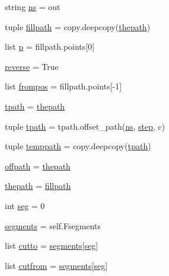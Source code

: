 \begin{DoxyCompactItemize}
\item 
string \hyperlink{classpath_1_1_path_aba8a261c06a62c46b5b50cc2218984e5}{ns} = \textquotesingle{}out\textquotesingle{}
\item 
tuple \hyperlink{classpath_1_1_path_ae925ef71c080bd87e3599b6d4f9944fc}{fillpath} = copy.\+deepcopy(\hyperlink{classpath_1_1_path_a4337dff6fcad60083e92642dd6e15dea}{thepath})
\item 
list \hyperlink{classpath_1_1_path_a4ca57bb02bfd7328aa373670e42cc7c2}{p} = fillpath.\+points\mbox{[}0\mbox{]}
\item 
\hyperlink{classpath_1_1_path_a3cd9f7f776de6ac323126a84e0a9d118}{reverse} = True
\item 
list \hyperlink{classpath_1_1_path_a17defa4d0edda7c8df002844662f3eb5}{frompos} = fillpath.\+points\mbox{[}-\/1\mbox{]}
\item 
\hyperlink{classpath_1_1_path_a082ac83dbda37eba9befcae8be0df595}{tpath} = \hyperlink{classpath_1_1_path_a4337dff6fcad60083e92642dd6e15dea}{thepath}
\item 
tuple \hyperlink{classpath_1_1_path_a267b3e61d69b7d9283b8d751eda8eaab}{tpath} = tpath.\+offset\+\_\+path(\hyperlink{classpath_1_1_path_acee5971500259152902b431cfae4248a}{ns}, \hyperlink{classpath_1_1_path_a197eeae0afc70cd672c698e5aa7fda86}{step}, c)
\item 
tuple \hyperlink{classpath_1_1_path_ac029f86e7895332b5d9a4a2948e18f4f}{temppath} = copy.\+deepcopy(\hyperlink{classpath_1_1_path_a082ac83dbda37eba9befcae8be0df595}{tpath})
\item 
\hyperlink{classpath_1_1_path_a9c87a4a17044e1bdfc596ebc4f894b60}{offpath} = \hyperlink{classpath_1_1_path_a4337dff6fcad60083e92642dd6e15dea}{thepath}
\item 
\hyperlink{classpath_1_1_path_a4337dff6fcad60083e92642dd6e15dea}{thepath} = \hyperlink{classpath_1_1_path_ae925ef71c080bd87e3599b6d4f9944fc}{fillpath}
\item 
int \hyperlink{classpath_1_1_path_a32a005518b591b36c440e28d127b3058}{seg} = 0
\item 
\hyperlink{classpath_1_1_path_a9f41c796727af301dfd7803f47f4414c}{segments} = self.\+Fsegments
\item 
list \hyperlink{classpath_1_1_path_a5c2420e508fe938cb377392ba67e40c6}{cutto} = \hyperlink{classpath_1_1_path_a9f41c796727af301dfd7803f47f4414c}{segments}\mbox{[}\hyperlink{classpath_1_1_path_a32a005518b591b36c440e28d127b3058}{seg}\mbox{]}
\item 
list \hyperlink{classpath_1_1_path_af61683e602531ffee156f32343753260}{cutfrom} = \hyperlink{classpath_1_1_path_a9f41c796727af301dfd7803f47f4414c}{segments}\mbox{[}\hyperlink{classpath_1_1_path_a32a005518b591b36c440e28d127b3058}{seg}\mbox{]}

\end{DoxyCompactItemize}
